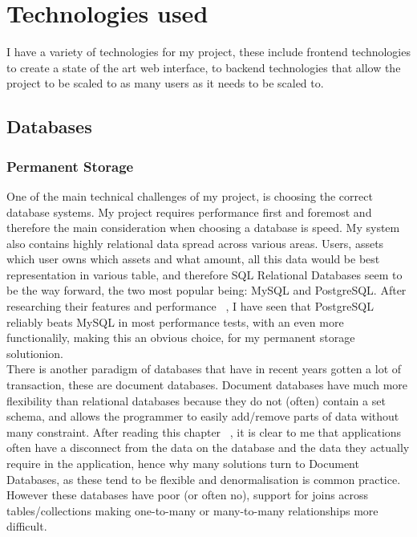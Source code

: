 \documentclass[titlepage]{article}
\begin{document}
\section{Technologies used}
I have a variety of technologies for my project, these include frontend technologies to create a state of the art web interface, to backend technologies that allow the project to be scaled to as many users as it needs to be scaled to. \\

\subsection{Databases}

\subsubsection{Permanent Storage}
One of the main technical challenges of my project, is choosing the correct database systems. My project requires performance first and foremost and therefore the main consideration when choosing a database is speed. My system also contains highly relational data spread across various areas. Users, assets which user owns which assets and what amount, all this data would be best representation in various table, and therefore SQL Relational Databases seem to be the way forward, the two most popular being: MySQL and PostgreSQL. After researching their features and performance ~\cite{postgres_vs_mysql}, I have seen that PostgreSQL reliably beats MySQL in most performance tests, with an even more functionalily, making this an obvious choice, for my permanent storage solutionion. \\

There is another paradigm of databases that have in recent years gotten a lot of transaction, these are document databases. Document databases have much more flexibility than relational databases because they do not (often) contain a set schema, and allows the programmer to easily add/remove parts of data without many constraint. After reading this chapter ~\cite{relational_vs_document}, it is clear to me that applications often have a disconnect from the data on the database and the data they actually require in the application, hence why many solutions turn to Document Databases, as these tend to be flexible and denormalisation is common practice. However these databases have poor (or often no), support for joins across tables/collections making one-to-many or many-to-many relationships more difficult. \\
\end{document}
